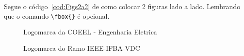 Segue o código~\ref{cod:Figs2a2} de como colocar 2 figuras lado a lado. Lembrando que o comando \verb|\fbox{}| é opcional.

\begin{Codigo}[language=tex, 
    caption=Sintaxe para adicionar 2 Figuras lado a lado no Texto, 
    label=cod:Figs2a2]
\begin{figure}[htb] 
  \begin{minipage}[b]{0.44 \linewidth}
     \caption{Logomarca da COEEL - Engenharia Eletrica}
     \label{fig:LogoCOEEL2}
  \end{minipage}
  \hfill
  \begin{minipage}[b]{0.44 \linewidth}
    \caption{Logomarca do Ramo IEEE-IFBA-VDC}
    \label{fig:LogoIEEE}         
  \end{minipage} 
\end{figure}
\end{Codigo}

